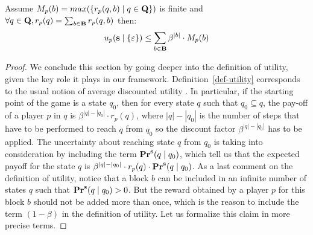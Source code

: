 \begin{myprop}\label{prop:bound}
Assume $M_p(b) = max(\{r_p(q,b) \mid q \in \mathbf{Q} \})$ is finite and $\forall q \in \mathbf{Q}, r_p(q) = \sum_{b \in \text{\bf B}} r_p(q,b)$ then:
\begin{equation*}
u_p(\mathbf{s} \mid \{\varepsilon\}) \leq   \sum_{b \in \mathbf{B}} \beta^{|b|} \cdot M_p(b)
\end{equation*}
\end{myprop}
\iffalse
\begin{proof}
We conclude this section by going deeper into the definition of utility, given the key role it plays in our framework.
Definition~\ref{def-utility} corresponds to the usual notion of average discounted utility . In particular, if the starting point of the game is a state $q_0$, then for every state $q$ such that $q_0 \subseteq q$, the pay-off of a player $p$ in $q$ is $\beta^{|q|-|q_0|} \cdot r_p(q)$, where $|q|-|q_0|$ is the number of steps that have to be performed to reach $q$ from $q_0$ so the discount factor $\beta^{|q|-|q_0|}$ has to be applied. The uncertainty  about reaching state $q$ from $q_0$ is taking into consideration by including the term $\mathbf{Pr}^{\mathbf{s}}(q \mid q_0)$, which tell us that the expected payoff for the state $q$ is $\beta^{|q|-|q_0|} \cdot  r_p(q) \cdot \mathbf{Pr}^{\mathbf{s}}(q \mid q_0)$.
%
As a last comment on the definition of utility, notice that a block $b$ can be included in an infinite number of states $q$ such that $\mathbf{Pr}^{\mathbf{s}}(q \mid q_0) > 0$. But the reward obtained by a player $p$ for this block $b$ should not be added more than once, which is the reason to include the term $(1 - \beta)$ in the definition of utility. Let us formalize this claim in more precise terms.


\end{proof}
